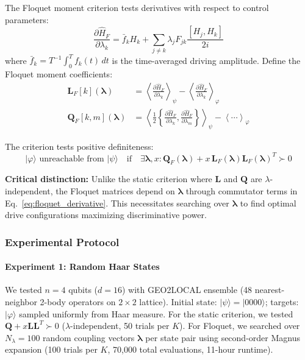 The Floquet moment criterion tests derivatives with respect to control parameters:
\begin{equation}
\frac{\partial \hat{H}_F}{\partial \lambda_k} = \bar{f}_k H_k + \sum_{j \neq k} \lambda_j F_{jk} \frac{[H_j, H_k]}{2i}
\label{eq:floquet_derivative}
\end{equation}
where $\bar{f}_k = T^{-1}\int_0^T f_k(t)\,dt$ is the time-averaged driving amplitude. Define the Floquet moment coefficients:
\begin{align}
\mathbf{L}_F[k](\boldsymbol{\lambda}) &= \left\langle \frac{\partial \hat{H}_F}{\partial \lambda_k} \right\rangle_\psi - \left\langle \frac{\partial \hat{H}_F}{\partial \lambda_k} \right\rangle_\varphi \\
\mathbf{Q}_F[k,m](\boldsymbol{\lambda}) &= \left\langle \frac{1}{2}\left\{\frac{\partial \hat{H}_F}{\partial \lambda_k}, \frac{\partial \hat{H}_F}{\partial \lambda_m}\right\} \right\rangle_\psi - \left\langle \cdots \right\rangle_\varphi
\end{align}

The criterion tests positive definiteness:
\begin{equation}
\boxed{
|\varphi\rangle \text{ unreachable from } |\psi\rangle \quad \text{if} \quad
\exists \boldsymbol{\lambda}, x : \mathbf{Q}_F(\boldsymbol{\lambda}) + x \, \mathbf{L}_F(\boldsymbol{\lambda}) \mathbf{L}_F(\boldsymbol{\lambda})^T \succ 0
}
\label{eq:floquet_criterion}
\end{equation}

\textbf{Critical distinction:} Unlike the static criterion where $\mathbf{L}$ and $\mathbf{Q}$ are $\lambda$-independent, the Floquet matrices depend on $\boldsymbol{\lambda}$ through commutator terms in Eq.~\eqref{eq:floquet_derivative}. This necessitates searching over $\boldsymbol{\lambda}$ to find optimal drive configurations maximizing discriminative power.

\subsubsection{Experimental Protocol}

\paragraph{Experiment 1: Random Haar States}
We tested $n=4$ qubits ($d=16$) with GEO2LOCAL ensemble (48 nearest-neighbor 2-body operators on $2\times 2$ lattice). Initial state: $|\psi\rangle = |0000\rangle$; targets: $|\varphi\rangle$ sampled uniformly from Haar measure. For the static criterion, we tested $\mathbf{Q} + x\mathbf{L}\mathbf{L}^T \succ 0$ ($\lambda$-independent, 50 trials per $K$). For Floquet, we searched over $N_\lambda = 100$ random coupling vectors $\boldsymbol{\lambda}$ per state pair using second-order Magnus expansion (100 trials per $K$, 70,000 total evaluations, 11-hour runtime).


